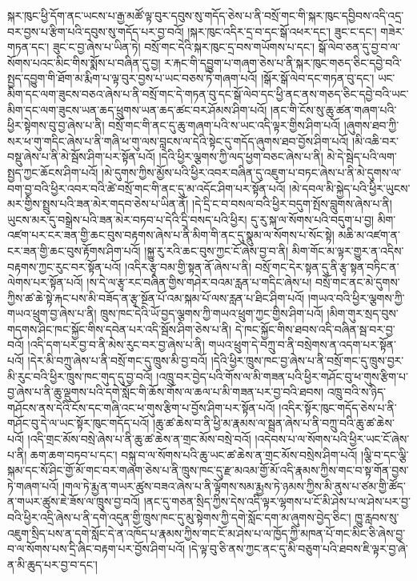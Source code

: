 སྐར་ཁུང་ཕྱི་དོག་ནང་ཡངས་པ་རྒྱ་མཚོ་ལྟ་བུར་དབུས་སུ་གདོད་ཅེས་པ་ནི་བསྲོ་གང་གི་སྐར་ཁུང་དབྱིབས་འདི་འདྲ་བར་བྱས་པ་རྩིག་པའི་དབུས་སུ་གདོད་པར་བྱ་བའོ། །སྐར་ཁུང་འདིར་དྲ་བ་དང་སྒོ་འཕར་དང་། ཟུང་ང་དང་། གཟེར་གཏན་དང་། ཟུང་ང་བྱ་ཞེས་པ་ཡིན་ཏེ། བསྲོ་གང་དེའི་སྐར་ཁུང་དྲ་བས་གཡོགས་པ་དང་། སྒོ་ལེབ་ཅན་དུ་བྱ་བ་ལ་སོགས་པའང་མིང་གིས་སྨོས་པ་བཞིན་དུ་བྱ། ར་རྐང་གི་དབྱུག་པ་གཞག་ཅེས་པ་ནི་སྐར་ཁུང་གཅད་ཅིང་དབྱེ་བའི་སྤྱད་དབྱུག་གི་ཐོག་མ་རྨིག་པ་ལྟ་བུར་བྱས་པ་ཡང་བཅས་ཏེ་གཞག་པའོ། །སྒོར་སྒོ་ལེབ་དང་གཏན་བུ་དང་། ཡང་མིག་དང་ལག་ཟུངས་བཅའ་ཞེས་པ་ནི་བསྲོ་གང་དེ་གཏན་བུ་དང་སྒོ་ལེབ་དང་ཕྱི་ནང་ནས་གཅད་ཅིང་དབྱེ་བའི་ཡང་མིག་དང་ལག་ཟུངས་ཡན་ཆད་ཕྲུགས་ཡན་ཆད་ཚང་བར་ཤོམས་ཤིག་པའོ། །ནང་གི་ངོས་སུ་ཆུ་ཚན་གཞག་པའི་ཕྱིར་སྟེགས་བུ་བྱ་ཞེས་པ་ནི། བསྲོ་གང་གི་ནང་དུ་ཆུ་གཞག་པའི་ས་ཡང་འདི་ལྟར་གྱིས་ཤིག་པའོ། །ཞུགས་ཐབ་ཀྱི་སར་ཕ་གུ་གདིང་ཞེས་པ་ནི་གཞི་ཕ་གུ་ལས་བླངས་ལ་དེའི་སྟེང་དུ་གདོད་ཞུགས་ཐབ་བྱོས་ཤིག་པའོ། །མི་འཆི་བར་བསྡུ་ཞེས་པ་ནི་མེ་སྦོས་ཤིག་པར་སྟོན་པའོ། །དེའི་ཕྱིར་ལྕགས་ཀྱི་ལད་ཕྱག་བཅང་ཞེས་པ་ནི། མེ་དེ་སྦེད་པའི་ལག་སྤྱད་ཀྱང་ཆོངས་ཤིག་པའོ། །མེ་དུགས་ཀྱིས་མྱོས་པའི་ཕྱིར་འབར་བཞིན་དུ་འཇུག་པ་བཏང་ཞེས་པ་ནི་མེ་དུགས་ལ་བག་བྱ་བའི་ཕྱིར་འབར་བའི་ཚེ་བསྲོ་གང་གི་ནང་དུ་མ་འདོང་ཤིག་པར་སྟོན་པའོ། །མེ་དབལ་མི་སྐྱེད་པའི་ཕྱིར་ཡུངས་མར་གྱིས་སྤྲུས་པའི་ཟན་མེར་གདབ་ཅེས་པ་ཡིན་ནོ། །དེ་དྲི་ང་བ་བསལ་བའི་ཕྱིར་བདུག་སྤོས་བླུགས་ཞེས་པ་ནི། ཡུངས་མར་དུ་བསྒྲེས་པའི་ཟན་མེར་བཏབ་པ་དེའི་དྲི་བསད་པའི་ཕྱིར། དུ་རུ་སྐ་ལ་སོགས་པའི་བདུག་པ་བྱ། མིག་འཛག་པར་ངར་ཟན་གྱི་ཆང་བུས་བརྟགས་ཞེས་པ་ནི་མིག་གི་ནང་དུ་སྣུམ་ལ་སོགས་པ་སོང་སྟེ། མཆི་མ་འཛག་ན་ངར་ཟན་གྱི་ཆང་བུས་རྟོགས་ཤིག་པའོ། །སྐྱུ་རུ་རའི་ཆང་བུས་ཀྱང་ངོ་ཞེས་བྱ་བ་ནི། མིག་གོང་མ་ལྟར་གྱུར་ན་འདིས་བརྟགས་ཀྱང་རུང་བར་སྟོན་པའོ། །འདིར་རྩྭ་བམ་གྱི་སྟན་ནོ་ཞེས་པ་ནི། བསྲོ་གང་དེར་སྟན་དུ་ནི་རྩྭ་སྟན་བཏིང་ན་ལེགས་པར་སྟོན་པའོ། །ས་དེ་ལ་རྩྭ་རང་བཞིན་གྱིས་གཤེར་བའམ་རླན་པ་གདིང་ཞེས་པ། བསྲོ་གང་ནང་མེ་དུགས་ཀྱིས་ཚ་ཆེ་སྟེ་རྐང་པས་མི་བཟོད་ན་རྩྭ་སྔོན་པོ་འམ་སྐམ་པོ་ལས་རླན་པ་ཐིང་ཤིག་པའོ། །གཡའ་བའི་ཕྱིར་ལྕགས་ཀྱི་གཡའ་ཕྲུག་བྱ་ཞེས་པ་ནི། ཁྲུས་ཁང་དེའི་ཡོ་བྱད་ལྕགས་ཀྱི་གཡའ་ཕྲུག་ཀྱང་གྱིས་ཤིག་པའོ། །མིག་གུར་སྲད་བུས་གདགས་ཤིང་ཁང་སྐྱོང་གིས་དབེན་པར་འདི་སྦོས་ཤིག་ཅེས་པ་ནི། དེ་ཁང་སྐྱོང་གིས་ཐབས་འདི་བཞིན་སྦ་བར་བྱ་བའོ། །འདི་དག་པར་བྱ་བ་ནི་མེས་རུང་བར་བྱ་ཞེས་པ་ནི། གཡའ་ཕྲུག་དེ་བཀྲུ་བ་ནི་བསྲེགས་ན་འདག་པར་སྟོན་པའོ། །དེར་མི་བཀྲུ་ཞེས་པ་ནི་བསྲོ་གང་དུ་ཁྲུས་མི་བྱ་བའོ། །དེའི་ཕྱིར་ཁྲུས་ཁང་བྱ་ཞེས་པ་ནི་བསྲོ་གང་དུ་ཁྲུས་བྱར་མི་རུང་བའི་ཕྱིར་ཁྲུས་ཁང་གུད་དུ་བྱ་བའོ། །འཁྲུ་བར་བྱེད་པའི་གོས་ལ་མི་གཟན་པའི་ཕྱིར་གཤོང་བུ་ཕ་གུས་རྩིག་པ་བྱ་ཞེས་པ་ནི་ཆུ་ལྡུགས་པའི་དགེ་སློང་གི་ཆོས་གོས་ལ་ཆལ་པ་མི་གཟན་པར་བྱ་བའི་ཐབས། འཁྲུ་བའི་ས་ཉིད་གཤོངས་ནས་དེའི་ངོས་དང་གཞི་འང་ཕ་གུས་རྩིག་པ་བྱོས་ཤིག་པར་སྟོན་པའོ། །འདིར་སྟོར་ཁུང་གདོད་ཅེས་པ་ནི་གཤོང་བུ་དེ་ལ་ཡང་སྟོར་ཁུང་གདོད་པའོ། །ཆུ་ཚ་ཆེས་བ་ནི་ཕྱི་མ་རྣམས་ལ་སྦྲན་ཞེས་པ་ནི་བཀྲུ་བའི་ཆུ་ཚ་ཆེས་པའོ། །འདི་གྲང་མོས་བསྲེ་ཞེས་པ་ནི་ཆུ་ཚ་ཆེས་ན་གྲང་མོས་བསྲེ་བའོ། །འདེབས་པ་ལ་སོགས་པའི་ཕྱིར་ཡང་ངོ་ཞེས་པ་ནི། ཆག་ཆག་བཏབ་པ་དང་། བསྐུ་བ་ལ་སོགས་པའི་ཆུ་ཡང་ཚ་ཆེས་ན་གྲང་མོས་བསྲེས་ཤིག་པའོ། །ལྕི་བ་དང་ལྕི་སྐམ་དང་སོ་ཤིང་གྱོ་མོ་གང་བར་གཞག་ཅེས་པ་ནི་ཁྲུས་ཁང་དུ་རྫ་མའམ་གྱོ་མོ་འདི་རྣམས་ཀྱིས་གང་བ་སྟ་གོན་བྱས་ཏེ་གཞག་པའོ། །གལ་ཏེ་རྨྱ་ན་གཡར་ཚུས་བཟའ་ཞེས་པ་ནི་ལྟོགས་སམ་རྨྱས་ཏེ་ཉམས་ཀྱིས་མི་ནུས་པ་ཙམ་གྱི་ཚོད་ན་གཡར་ཚུས་ཇེ་ཟོས་ལ་ཁྲུས་བྱ་བའོ། །ནང་དུ་གཅན་སྲིད་ཀྱིས་དེས་འདི་ལྟར་ལྷགས་པ་ངོ་མི་ཤེས་པ་ལ་ཤེས་པར་བྱ་བའི་ཕྱིར་འདྲི་ཞེས་པ་ནི་དགེ་འདུན་གྱི་ཁྲུས་ཁང་དུ་མུ་སྟེགས་ཀྱི་དགེ་སློང་དག་མ་ཞུགས་བྱེད་ཅིང་། ཁྱུ་རླབས་སུ་འཇུག་སྲིད་པས་ན་དགེ་སློང་དེ་ན་འཁོད་པ་རྣམས་ཀྱིས་གང་ངོ་མ་ཤེས་པ་ལ་ཁྱོད་ཀྱི་མཁན་པོ་གང་མིང་ཅི་ཞེས་བྱ་བ་ལ་སོགས་པས་དྲི་ཞིང་བརྟག་པར་བྱོས་ཤིག་པའོ། །དེ་ལྟ་བུ་ཅི་ནས་ཀྱང་ནང་དུ་མི་བཅུག་པའི་ཐབས་ཇི་ལྟར་བྱ་ཞེ་ན་མི་ཆུད་པར་བྱ་བ་དང་། 